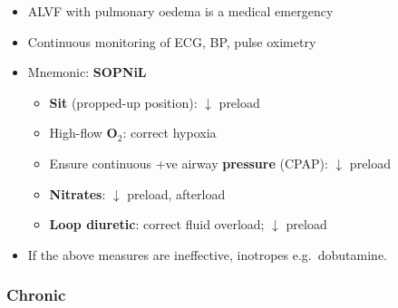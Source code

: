 \documentclass[
  12pt,
]{memoir}
\providecommand{\tightlist}{%
  \setlength{\itemsep}{0pt}\setlength{\parskip}{0pt}}
\begin{document}
\begin{itemize}
\tightlist
\item
  ALVF with pulmonary oedema is a medical emergency
\item
  Continuous monitoring of ECG, BP, pulse oximetry
\item
  Mnemonic: \textbf{SOPNiL}

  \begin{itemize}
  \tightlist
  \item
    \textbf{Sit} (propped-up position): \(\downarrow\) preload
  \item
    High-flow \textbf{O\(_2\)}: correct hypoxia
  \item
    Ensure continuous +ve airway \textbf{pressure} (CPAP):
    \(\downarrow\) preload
  \item
    \textbf{Nitrates}: \(\downarrow\) preload, afterload
  \item
    \textbf{Loop diuretic}: correct fluid overload; \(\downarrow\)
    preload
  \end{itemize}
\item
  If the above measures are ineffective, inotropes e.g.~dobutamine.
\end{itemize}

\hypertarget{chronic}{%
\subsubsection{Chronic}\label{chronic}}
\end{document}

